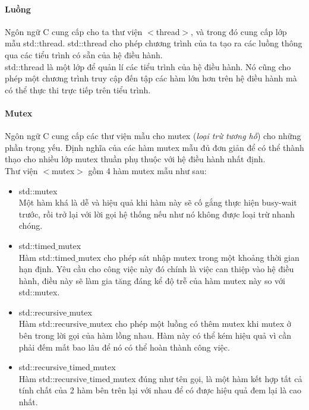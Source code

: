 \documentclass{article}
\begin{document}
\paragraph{Luồng}
Ngôn ngữ C cung cấp cho ta thư viện $<$thread$>$, và trong đó cung cấp lớp mẫu std::thread. std::thread cho phép chương trình của ta tạo ra các luồng thông qua các tiểu trình có sẵn của hệ điều hành.\\

std::thread là một lớp để quản lí các tiểu trình của hệ điều hành. Nó cũng cho phép một chương trình truy cập đến tập các hàm lớn hơn trên hệ điều hành mà có thể thực thi trực tiếp trên tiểu trình.\\
\paragraph{Mutex}
Ngôn ngữ C cung cấp các thư viện mẫu cho mutex (\textit{loại trừ tương hỗ}) cho những phần trọng yếu. Định nghĩa của các hàm mutex mẫu đủ đơn giản để có thể thành thạo cho nhiều lớp mutex thuần phụ thuộc với hệ điều hành nhất định.\\

Thư viện $<$mutex$>$ gồm 4 hàm mutex mẫu như sau:
\begin{itemize}
    \item std::mutex\\
    Một hàm khá là dễ và hiệu quả khi hàm này sẽ cố gắng thực hiện busy-wait trước, rồi trở lại với lời gọi hệ thống nếu như nó không được loại trừ nhanh chóng.
    \item std::timed$\_$mutex\\
    Hàm std::timed$\_$mutex cho phép sát nhập mutex trong một khoảng thời gian hạn định. Yêu cầu cho công việc này đó chính là việc can thiệp vào hệ điều hành, điều này sẽ làm gia tăng đáng kể độ trễ của hàm mutex này so với std::mutex.
    \item std::recursive$\_$mutex\\
    Hàm std::recursive$\_$mutex cho phép một luồng có thêm mutex khi mutex ở bên trong lời gọi của hàm lồng nhau. Hàm này có thể kém hiệu quả vì cần phải đếm mất bao lâu để nó có thể hoàn thành công việc.
    \item std::recursive$\_$timed$\_$mutex\\
    Hàm std::recursive$\_$timed$\_$mutex đúng như tên gọi, là một hàm kết hợp tất cả tính chất của 2 hàm bên trên lại với nhau để có được hiệu quả đem lại là cao nhất.
\end{itemize}
\end{document}

